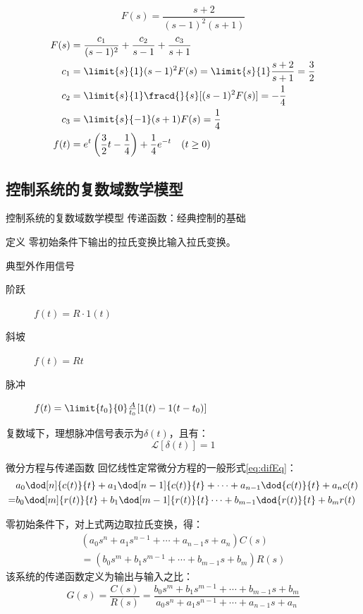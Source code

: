 \documentclass[handout,cjkutf8,table,aspectratio=1610]{beamer} %
\begin{document}
\begin{frame}{}
	$$F(s)=\frac{s+2}{(s-1)^2(s+1)}$$
	\begin{align*}
		F(s)	&=\frac{c_1}{(s-1)^2}+\frac{c_2}{s-1}+\frac{c_3}{s+1}\\
		c_1	&=\limit{s}{1}(s-1)^2F(s)=\limit{s}{1}\frac{s+2}{s+1}=\frac{3}{2}\\
		c_2	&=\limit{s}{1}\fracd{}{s}[(s-1)^2F(s)]=-\frac{1}{4}\\
		c_3	&=\limit{s}{-1}(s+1)F(s)=\frac{1}{4}\\
		f(t)	&=e^t\left(\frac{3}{2}t-\frac{1}{4}\right)+\frac{1}{4}e^{-t}\quad (t\ge 0)
		\end{align*}
\end{frame}

\subsection{控制系统的复数域数学模型}
\begin{frame}{控制系统的复数域数学模型}
传递函数：经典控制的基础~~~~~~~~
\begin{block}{定义}
零初始条件下输出的拉氏变换比输入拉氏变换。
\end{block}
\begin{block}{典型外作用信号}
\begin{description}
\item[阶跃]$f(t)=R\cdot1(t)$
\item[斜坡]$f(t)=Rt$
\item[脉冲]$f(t)=\limit{t_0}{0}\frac{A}{t_0}[1(t)-1(t-t_0)]$
\end{description}
\end{block}
复数域下，理想脉冲信号表示为$\delta(t)$，且有：
$$\mathcal{L}[\delta(t)]=1$$
\end{frame}

\begin{frame}{微分方程与传递函数}
回忆线性定常微分方程的一般形式\eqref{eq:difEq}：
\begin{align*}
	&a_{0}\dod[n]{c(t)}{t}+a_{1}\dod[n-1]{c(t)}{t}+\cdots+a_{n-1}\dod{c(t)}{t}+a_nc(t)\nonumber\\
	=&b_{0}\dod[m]{r(t)}{t}+b_{1}\dod[m-1]{r(t)}{t}\cdots+b_{m-1}\dod{r(t)}{t}+b_mr(t)\end{align*}

零初始条件下，对上式两边取拉氏变换，得：
\begin{align}
(a_0s^n+a_1s^{n-1}+\cdots+a_{n-1}s+a_n)C(s)\nonumber\\
=(b_0s^m+b_1s^{m-1}+\cdots+b_{m-1}s+b_m)R(s)
\end{align}
该系统的传递函数定义为输出与输入之比：
\begin{equation}
G(s)=\frac{C(s)}{R(s)}=\frac{b_0s^m+b_1s^{m-1}+\cdots+b_{m-1}s+b_m}{a_0s^n+a_1s^{n-1}+\cdots+a_{n-1}s+a_n}
\end{equation}
\end{frame}
\end{document}
